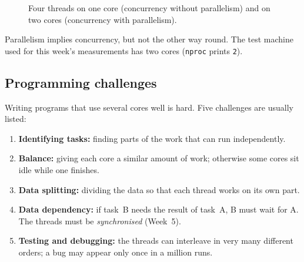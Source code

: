 \documentclass[11pt,a4paper]{article}
\newcommand{\cmd}[1]{\texttt{#1}}
\begin{document}
\begin{figure}[H]
\centering
{}
\caption{Four threads on one core (concurrency without parallelism) and on two cores (concurrency with parallelism).}
\end{figure}

Parallelism implies concurrency, but not the other way round. The test machine used for this week's measurements has two cores (\cmd{nproc} prints \texttt{2}).

\subsection{Programming challenges}

Writing programs that use several cores well is hard. Five challenges are usually listed:
\begin{enumerate}[leftmargin=1.4em]
  \item \textbf{Identifying tasks:} finding parts of the work that can run independently.
  \item \textbf{Balance:} giving each core a similar amount of work; otherwise some cores sit idle while one finishes.
  \item \textbf{Data splitting:} dividing the data so that each thread works on its own part.
  \item \textbf{Data dependency:} if task~B needs the result of task~A, B must wait for A. The threads must be \emph{synchronised} (Week~5).
  \item \textbf{Testing and debugging:} the threads can interleave in very many different orders; a bug may appear only once in a million runs.
\end{enumerate}
\end{document}
